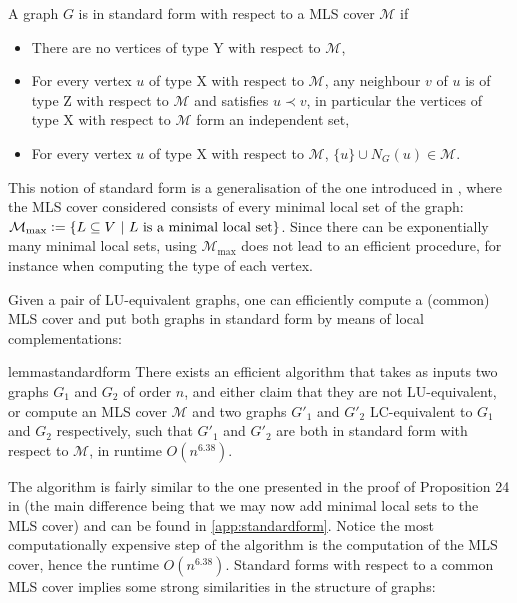 \documentclass[a4paper,UKenglish,cleveref,autoref,thm-restate]{arxiv}
\newcommand{\defeq}{\vcentcolon=}
\newcommand{\se}{\subseteq}
\begin{document}
\begin{definition}
    A graph $G$ is in standard form with respect to a MLS cover $\mathcal M$ if
    \begin{itemize}
        \item There are no vertices of type Y with respect to $\mathcal M$,
        \item For every vertex $u$ of type X with respect to $\mathcal M$, any neighbour $v$ of $u$ is of type Z with respect to $\mathcal M$ and satisfies $u\prec v$, in particular the vertices of type X with respect to $\mathcal M$ form an independent set,
        \item For every vertex $u$ of type X with respect to $\mathcal M$, $\{u\} \cup N_G(u) \in \mathcal M$.
    \end{itemize}
\end{definition}

\begin{remark}This notion of standard form is a generalisation of the one introduced in \cite{claudet2024local}, where the MLS cover considered consists of every minimal local set of the graph: $\mathcal M_\text{max} \defeq \{L \se V ~|~ L \text{~is a minimal local set}\}$. Since there can be exponentially many minimal local sets, using $\mathcal M_\text{max}$ does not lead to an efficient procedure, for instance when computing the type of each vertex.
\end{remark}

Given a pair of LU-equivalent graphs, one can efficiently compute a (common) MLS cover and put both graphs in standard form by means of local complementations:

\begin{restatable}{lemma}{standardform} \label{lemma:standardform}
    There exists an efficient algorithm that takes as inputs two graphs $G_1$ and $G_2$ of order $n$, and either claim that they are not LU-equivalent, or compute an MLS cover $\mathcal M$ and two graphs $G'_1$ and $G'_2$ LC-equivalent to $G_1$ and $G_2$ respectively, such that $G'_1$ and $G'_2$ are both in standard form with respect to $\mathcal M$, in runtime $O(n^{6.38})$.
\end{restatable}

The algorithm is fairly similar to the one presented in the proof of Proposition 24 in \cite{claudet2024local} (the main difference being that we may now add minimal local sets to the MLS cover) and can be found in \cref{app:standardform}. Notice the most computationally expensive step of the algorithm is the computation of the MLS cover, hence the runtime $O(n^{6.38})$. Standard forms with respect to a common MLS cover implies some strong similarities in the structure of graphs:
\end{document}
